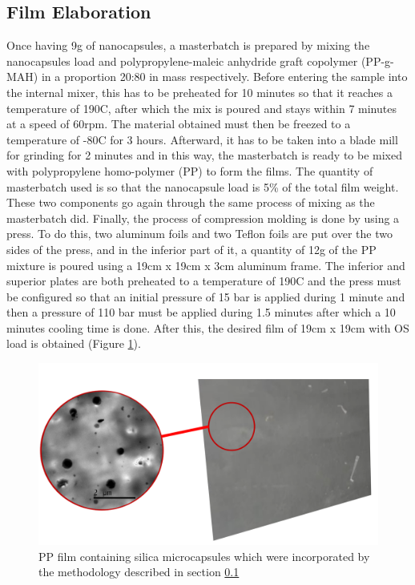 \begin{refsection}
\subsection{Film Elaboration} \label{sec:film_elaboration}
Once having 9g of nanocapsules, a masterbatch is prepared by mixing the nanocapsules load and polypropylene-maleic anhydride graft copolymer (PP-g-MAH) in a proportion 20:80 in mass respectively. Before entering the sample into the internal mixer, this has to be preheated for 10 minutes so that it reaches a temperature of 190\degree C, after which the mix is poured and stays within 7 minutes at a speed of 60rpm. The material obtained must then be freezed to a temperature of -80\degree C for 3 hours. Afterward, it has to be taken into a blade mill for grinding for 2 minutes and in this way, the masterbatch is ready to be mixed with polypropylene homo-polymer (PP) to form the films. The quantity of masterbatch used is so that the nanocapsule load is 5\% of the total film weight. These two components go again through the same process of mixing as the masterbatch did. Finally, the process of compression molding is done by using a press. To do this, two aluminum foils and two Teflon foils are put over the two sides of the press, and in the inferior part of it, a quantity of 12g of the PP mixture is poured using a 19cm x 19cm x 3cm aluminum frame. The inferior and superior plates are both preheated to a temperature of 190\degree C and the press must be configured so that an initial pressure of 15 bar is applied during 1 minute and then a pressure of 110 bar must be applied during 1.5 minutes after which a 10 minutes cooling time is done. After this, the desired film of 19cm x 19cm with OS load is obtained (Figure \ref{fig:film}).

\begin{figure}[ht]
    \centering
    \includegraphics[width=0.6\linewidth]{Documento_Latex/Imagenes/pelicula.png}
    \caption{PP film containing silica microcapsules which were incorporated by the methodology described in section \ref{sec:film_elaboration} \cite{ArellanoAyala2019EfectosAntioxidantes}}
    \label{fig:film}
\end{figure}


\end{refsection}
